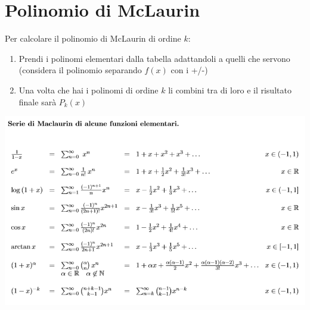 \documentclass[10pt, a4paper]{article}
\begin{document}
\section{Polinomio di McLaurin}
    Per calcolare il polinomio di McLaurin di ordine $k$:
    \begin{enumerate}
        \item Prendi i polinomi elementari dalla tabella adattandoli a quelli che servono (considera il polinomio separando $f(x)$ con i +/-)
        \item Una volta che hai i polinomi di ordine $k$ li combini tra di loro e il risultato finale sarà $P_k(x)$
    \end{enumerate}
    \begin{center}
        \includegraphics[width = \textwidth]{Images/seriedimaclaurin.png}
    \end{center}
\end{document}
